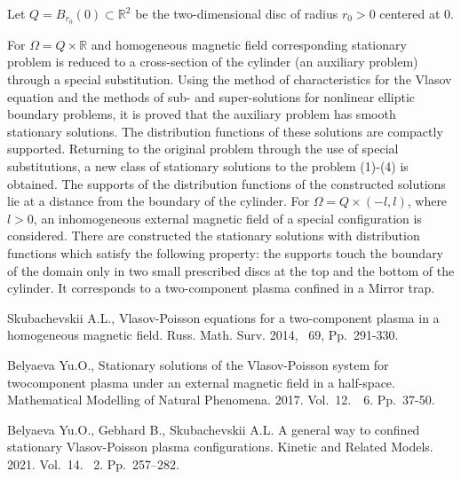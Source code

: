 \documentclass[12pt]{llncs}
\begin{document}
Let $Q=B_{r_0}(0) \subset \mathbb{R}^2$
be the two-dimensional disc of radius $r_0>0$ centered at 0. 

For $\Omega=Q\times \mathbb{R}$ and 
homogeneous magnetic field corresponding stationary problem is reduced to a cross-section of the cylinder (an auxiliary problem) through a special substitution. Using the method of characteristics for the Vlasov equation and the methods of sub- and super-solutions for nonlinear elliptic boundary problems, it is proved that the auxiliary problem has smooth stationary solutions. The distribution functions of these solutions are compactly supported. Returning to the original problem through the use of special substitutions, a new class of stationary solutions to the problem (1)-(4) is obtained. The supports of the distribution functions of the constructed solutions lie at a distance from the boundary of the cylinder.
For  $\Omega=Q\times (-l,l)$, where $l>0$,  an inhomogeneous external magnetic field of
a special configuration is considered. There are constructed the stationary solutions
with distribution functions which satisfy the following property: the supports touch
the boundary of the domain only in two small prescribed discs at the top and the
bottom of the cylinder. It corresponds to a two-component plasma confined in a Mirror trap. 


\begin{thebibliography}{9} 

Skubachevskii A.L., Vlasov-Poisson equations for a two-component plasma in a homogeneous
magnetic field. Russ. Math. Surv. 2014, ~69, Pp.~291-330.


Belyaeva Yu.O., Stationary solutions of the Vlasov-Poisson system for twocomponent
plasma under an external magnetic field in a half-space.
Mathematical Modelling of Natural Phenomena. 2017. Vol.~12.~\textnumero~6.
Pp.~37-50.

Belyaeva Yu.O., Gebhard B., Skubachevskii A.L. 
A general way to confined stationary Vlasov-Poisson plasma configurations. Kinetic and Related Models. 2021. Vol.~14. \textnumero~2.  Pp.~257--282.
\end{thebibliography}
\end{document}
